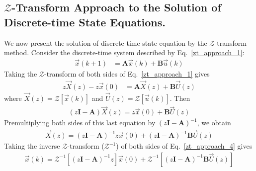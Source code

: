 \documentclass[11pt,a4paper,oneside]{book}
\numberwithin{equation}{section}
\theoremstyle{it}
\theoremstyle{definition}
\begin{document}
\subsection{$\mathbf{\mathcal{Z}}$-Transform Approach to the Solution of 
	Discrete-time State Equations.} We now present the solution of 
	discrete-time 
state 
equation 
by the $\mathcal{Z}$-transform method. Consider the discrete-time system 
described by 
Eq.~\eqref{zt_approach_1}:
\begin{equation}\label{zt_approach_1}
	\begin{aligned}
		\vec{x}(k+1) &= \mathbf{A}\vec{x}(k)+\mathbf{B}\vec{u}(k)
	\end{aligned}
\end{equation}
Taking the $\mathcal{Z}$-transform of both sides of Eq.~\eqref{zt_approach_1} 
gives
\begin{equation}\label{zt_approach_2}
	\begin{aligned}
		z{\vec{X}}(z) -z\vec{x}(0) &= 
		\mathbf{A}{\vec{X}}(z)+\mathbf{B}{\vec{U}}(z)
	\end{aligned}
\end{equation}
where ${\vec{X}}(z) = \mathcal{Z}\left[ \vec{x}(k)\right]$ and ${\vec{U}}(z) 
= \mathcal{Z}\left[ \vec{u}(k)\right]$. Then
\begin{equation}\label{zt_approach_3}
	\begin{aligned}
		\left( z\mathbf{I}-\mathbf{A}\right){\vec{X}}(z) = z\vec{x}(0) + 
		\mathbf{B}{\vec{U}}(z)
	\end{aligned}
\end{equation}
Premultiplying both sides of this last equation by $\left( 
z\mathbf{I}-\mathbf{A}\right)^{-1}$, we obtain 
\begin{equation}\label{zt_approach_4}
	\begin{aligned}
		{\vec{X}}(z) = \left( z\mathbf{I}-\mathbf{A}\right)^{-1}z 
		\vec{x}(0)+\left( 
		z\mathbf{I}-\mathbf{A}\right)^{-1}\mathbf{B}{\vec{U}}(z)
	\end{aligned}
\end{equation}
Taking the inverse $\mathcal{Z}$-transform ($\mathcal{Z}^{-1}$) of both sides 
of Eq.~\eqref{zt_approach_4} gives
\begin{equation}\label{zt_approach_5}
	\begin{aligned}
		\vec{x}(k) = \mathcal{Z}^{-1}\left[ \left( 
		z\mathbf{I}-\mathbf{A}\right)^{-1}z\right] 
		\vec{x}(0)+\mathcal{Z}^{-1}\left[ \left( 
		z\mathbf{I}-\mathbf{A}\right)^{-1}\mathbf{B}{\vec{U}}(z)\right] 
	\end{aligned}
\end{equation}
\end{document}
